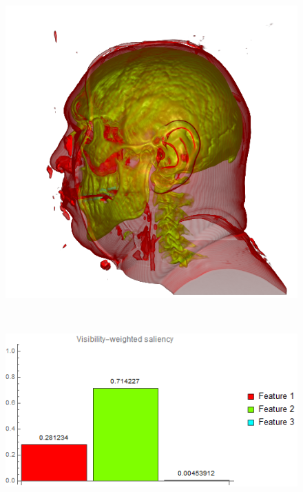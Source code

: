 \begin{figure}
\begin{minipage}{.24\textwidth}
		\includegraphics[width=1\linewidth]{images/vismale_naive}
		\subcaption{}
	\end{minipage}~
	\begin{minipage}{.25\textwidth}
		\includegraphics[width=1\linewidth]{images/vismale_naive_visibility_saliency_weighted_chart}
		\subcaption{}
	\end{minipage}
	\begin{minipage}{.24\textwidth}

\end{minipage}
\end{figure}

